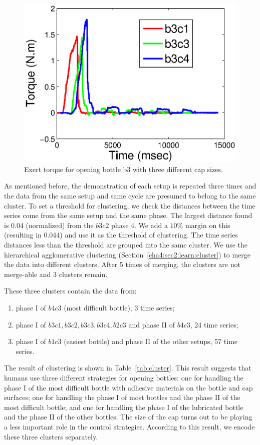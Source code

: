 \begin{figure}
    \centering
    \includegraphics[width=12cm]{./fig_cha4/c1c3c4_time_T.eps}
    \caption{ \scriptsize{Exert torque for opening bottle b3 with three different cap sizes.}
}
\label{fig:cappatterns}
\end{figure}


As mentioned before, the demonstration of each setup is repeated three times and the data from the same setup and same cycle are presumed to belong to the same cluster. To set a threshold for clustering, we check the distances between the time series come from the same setup and the same phase. The largest distance found is 0.04 (normalized) from the $b3c2$ phase 4. We add a $10\%$ margin on this (resulting in 0.044) and use it as the threshold of clustering. The time series distances less than the threshold are grouped into the same cluster. We use the hierarchical agglomerative clustering (Section~\ref{cha4:sec2:learn:cluster}) to merge the data into different clusters. After 5 times of merging, the clusters are not merge-able and 3 clusters remain.

These three clusters contain the data from:

\begin{enumerate}
\item phase I of $b4c3$ (most difficult bottle), 3 time series;
\item phase I of $b3c1, b3c2, b3c3, b3c4, b2c3$ and phase II of $b4c3$, 24 time series;
\item phase I of $b1c3$ (easiest bottle) and phase II of the other setups, 57 time series.
\end{enumerate}

The result of clustering is shown in Table~\ref{tab:cluster}. This result suggests that humans use three different strategies for opening bottles: one for handling the phase I of the most difficult bottle with adhesive materials on the bottle and cap surfaces; one for handling the phase I of most bottles and the phase II of the most difficult bottle; and one for handling the phase I of the lubricated bottle and the phase II of the other bottles. The size of the cap turns out to be playing a less important role in the control strategies. According to this result, we encode these three clusters separately.



